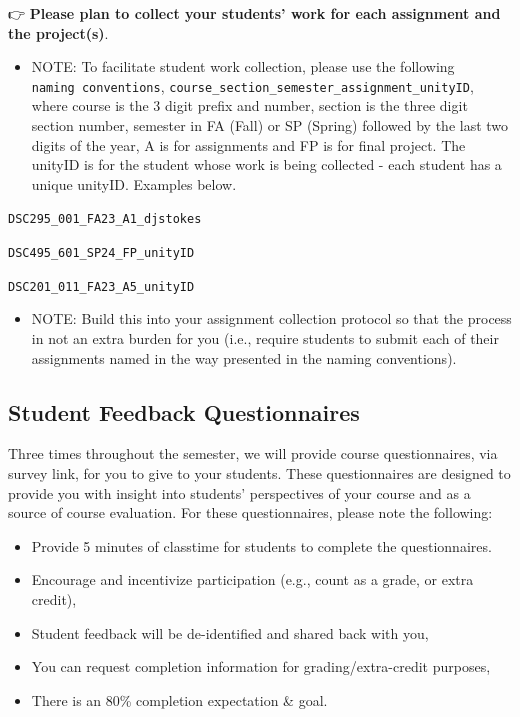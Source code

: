 \documentclass[
]{book}
\providecommand{\tightlist}{%
  \setlength{\itemsep}{0pt}\setlength{\parskip}{0pt}}
\begin{document}
👉 { \textbf{Please plan to collect your students' work for each assignment and the project(s)}. }

\begin{itemize}
\tightlist
\item
  NOTE: To facilitate student work collection, please use the following \texttt{naming\ conventions}, \texttt{course\_section\_semester\_assignment\_unityID}, where course is the 3 digit prefix and number, section is the three digit section number, semester in FA (Fall) or SP (Spring) followed by the last two digits of the year, A is for assignments and FP is for final project. The unityID is for the student whose work is being collected - each student has a unique unityID. Examples below.
\end{itemize}

\texttt{DSC295\_001\_FA23\_A1\_djstokes}

\texttt{DSC495\_601\_SP24\_FP\_unityID}

\texttt{DSC201\_011\_FA23\_A5\_unityID}

\begin{itemize}
\tightlist
\item
  NOTE: Build this into your assignment collection protocol so that the process in not an extra burden for you (i.e., require students to submit each of their assignments named in the way presented in the naming conventions).
\end{itemize}

\subsection{Student Feedback Questionnaires}\label{student-feedback-questionnaires}

Three times throughout the semester, we will provide course questionnaires, via survey link, for you to give to your students. These questionnaires are designed to provide you with insight into students' perspectives of your course and as a source of course evaluation. For these questionnaires, please note the following:

\begin{itemize}
\tightlist
\item
  Provide 5 minutes of classtime for students to complete the questionnaires.
\item
  Encourage and incentivize participation (e.g., count as a grade, or extra credit),
\item
  Student feedback will be de-identified and shared back with you,
\item
  You can request completion information for grading/extra-credit purposes,
\item
  There is an 80\% completion expectation \& goal.
\end{itemize}
\end{document}
